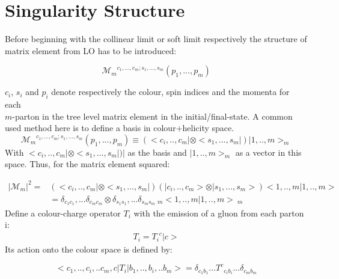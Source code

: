 \section*{Singularity Structure}

Before beginning with the collinear limit or soft limit respectively the structure of matrix element from LO has to be introduced:

\begin{equation}
{\mathcal{M}_m}^{c_1,...,c_m;s_1,...,s_m}(p_1,..., p_m)
\end{equation}

$ c_i $, $ s_i $ and $ p_i $ denote respectively the colour, spin indices and the momenta for each\\ $m$-parton in the tree level matrix element in the initial/final-state.
A common used method here is to define a basis in colour+helicity space.
\begin{equation}
{\mathcal{M}_m}^{c_1,...,c_m;s_1,...,s_m}(p_1,..., p_m)\equiv(<c_i,..,c_m|\otimes <s_1,...,s_m|)|1,..,m>_m
\end{equation}
With $ <c_i,..,c_m|\otimes <s_1,...,s_m|)| $ as the basis and $ |1,..,m>_m $ as a vector in this space.
Thus, for the matrix element squared:

\begin{equation}
\begin{split}
\vert \mathcal{M}_m \vert^2=& (< c_i,..,c_m | \otimes < s_1,...,s_m|)(| c_i,..,c_m > \otimes | s_1,...,s_m >) < 1,..,m | 1,..,m > \\
&=\delta_{c_1 c_1},...\delta_{c_m c_m} \otimes \delta_{s_1 s_1},...\delta_{s_ms_m} \:_m < 1,..,m | 1,..,m > \:_m
\end{split}
\end{equation}
Define a colour-charge operator  $ {T_i} $ with the
emission of a gluon from each parton i:
\begin{equation}
\begin{split}
T_i = {T_i}^c |c>
\end{split}
\end{equation}
Its action onto the colour space is defined by:

\begin{equation}
<c_1,..,c_i,..c_m,c|T_i|b_1,..,b_i,..b_m>=\delta_{c_1b_1}...{T^c}_{c_ib_i}
...\delta_{c_mb_m}
\end{equation}

